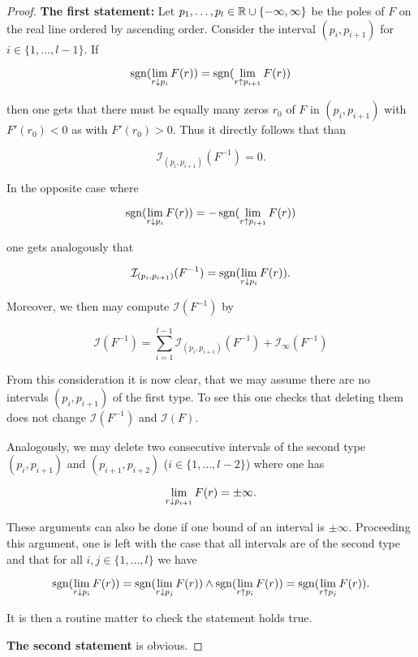 \begin{proof}
\textbf{The first statement:} Let $p_1,\ldots,p_l\in\mathbb{R}\cup\{-\infty,\infty\}$ be the poles of $F$ on the real line ordered by ascending order. Consider the interval $(p_i,p_{i+1})$ for $i\in\{1,\ldots,l-1\}$. If 

\begin{equation}
\operatorname{sgn}(\lim_{r\downarrow p_i}{F(r)})=\operatorname{sgn}(\lim_{r\uparrow p_{i+1}}{F(r)})\label{eq5}
\end{equation}

then one gets that there must be equally many zeros $r_0$ of $F$ in $(p_i,p_{i+1})$ with $F'(r_0)<0$ as with $F'(r_0)>0$. Thus it directly follows that than

\begin{equation}
\mathcal{I}_{(p_i,p_{i+1})}(F^{-1})=0\text{.}
\end{equation}  

In the opposite case where

\begin{equation}
\operatorname{sgn}(\lim_{r\downarrow p_i}{F(r)})=-\operatorname{sgn}(\lim_{r\uparrow p_{i+1}}{F(r)})\label{eq6}
\end{equation}

one gets analogously that 

\begin{equation}
\mathcal{I}_{(p_i,p_{i+1})}(F^{-1})=\operatorname{sgn}(\lim_{r\downarrow p_i}{F(r)})\text{.}
\end{equation} 

Moreover, we then may compute $\mathcal{I}(F^{-1})$ by

\begin{equation}
\mathcal{I}(F^{-1}) = \sum_{i=1}^{l-1}{\mathcal{I}_{(p_i,p_{i+1})}(F^{-1})}+\mathcal{I}_\infty(F^{-1})
\end{equation}

From this consideration it is now clear, that we may assume there are no intervals $(p_i,p_{i+1})$ of the first type. To see this one checks that deleting them does not change $\mathcal{I}(F^{-1})$ and $\mathcal{I}(F)$.

Analogously, we may delete two consecutive intervals of the second type $(p_i,p_{i+1})$ and $(p_{i+1},p_{i+2})$ ($i\in\{1,\ldots,l-2\}$) where one has 

\begin{equation}
\lim_{r\downarrow p_{i+1}}{F(r)} = \pm\infty\text{.}
\end{equation}

These arguments can also be done if one bound of an interval is $\pm\infty$.
Proceeding this argument, one is left with the case that all intervals are of the second type and that for all $i,j\in\{1,\ldots,l\}$ we have 

\begin{equation}
\operatorname{sgn}(\lim_{r\downarrow p_i}{F(r)})=\operatorname{sgn}(\lim_{r\downarrow p_j}{F(r)}) \wedge \operatorname{sgn}(\lim_{r\uparrow p_i}{F(r)})=\operatorname{sgn}(\lim_{r\uparrow p_j}{F(r)})\text{.}
\end{equation}

It is then a routine matter to check the statement holds true.

\textbf{The second statement} is obvious.
\end{proof}

